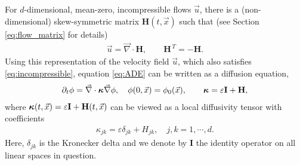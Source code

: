 \documentclass[11pt]{amsart}
\newcommand{\Hb}{\mathbf{H}}
\newcommand{\Ib}{\mathbf{I}}
\newcommand\bkappa{\mbox{\boldmath${\kappa}$}}
\begin{document}
For $d$-dimensional, mean-zero, incompressible flows $\vec{u}$, there
is a (non-dimensional) skew-symmetric 
matrix $\Hb(t,\vec{x})$ such that (see Section \ref{eq:flow_matrix}
for details) 
\begin{align}\label{eq:u_DH}
 \vec{u}=\vec{\nabla}\cdot\Hb, \qquad  \Hb^{\,T}=-\Hb.
\end{align}
Using this representation of the velocity field $\vec{u}$, which also
satisfies \eqref{eq:incompressible}, equation \eqref{eq:ADE} can be
written as a diffusion equation,  
%
\begin{align}\label{eq:ADE_Divergence}
  \partial_t\phi%
    =\vec{\nabla}\cdot\bkappa\vec{\nabla}\phi, \quad
    \phi(0,\vec{x})=\phi_0(\vec{x}),
    \qquad
    \bkappa=\varepsilon\Ib+\Hb,
\end{align}
%
where $\bkappa(t,\vec{x})=\varepsilon\Ib+\Hb(t,\vec{x})$ can be viewed as a local
diffusivity tensor with coefficients
%
\begin{align}\label{eq:kappa_coeff}
  \kappa_{jk}=\varepsilon\delta_{jk}+H_{jk},\quad j,k=1,\cdots,d.
\end{align}
%
Here, $\delta_{jk}$ is the Kronecker delta and we denote by $\Ib$ the
identity operator on all linear spaces in question.    
\end{document}

